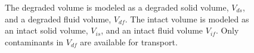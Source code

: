 \begin{figure}[h!]
  \begin{center}
    \def\svgwidth{\textwidth}
    
  \end{center}
  \caption[Constituents of a Mixed Cell Control Volume]{The degraded volume is 
  modeled as a degraded solid volume, $V_{ds}$, and a degraded fluid volume, 
  $V_{df}$. The intact volume is modeled as an intact solid volume, $V_{is}$, and 
  an intact fluid volume $V_{if}$.  Only contaminants in $V_{df}$ are available 
  for transport.}
  \label{fig:deg_sorb_volumes}
\end{figure}

